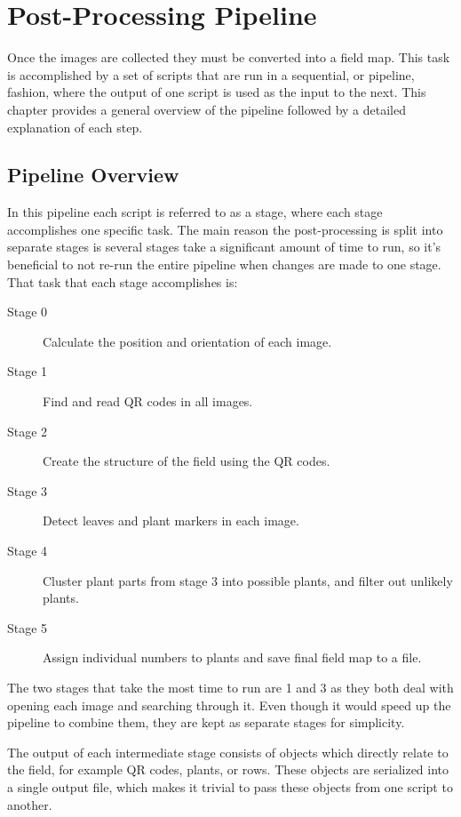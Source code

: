 
\cleardoublepage

\chapter{Post-Processing Pipeline}
\label{chapter:pipeline}

Once the images are collected they must be converted into a field map. This task is accomplished by a set of scripts that are run in a sequential, or pipeline, fashion, where the output of one script is used as the input to the next.  This chapter provides a general overview of the pipeline followed by a detailed explanation of each step.

\section{Pipeline Overview}
\label{processing-overview}

In this pipeline each script is referred to as a stage, where each stage accomplishes one specific task.  The main reason the post-processing is split into separate stages is several stages take a significant amount of time to run, so it's beneficial to not re-run the entire pipeline when changes are made to one stage.  That task that each stage accomplishes is:

\begin{description}
\item[Stage 0] Calculate the position and orientation of each image.
\item[Stage 1] Find and read QR codes in all images.
\item[Stage 2] Create the structure of the field using the QR codes.
\item[Stage 3] Detect leaves and plant markers in each image.
\item[Stage 4] Cluster plant parts from stage 3 into possible plants, and filter out unlikely plants.
\item[Stage 5] Assign individual numbers to plants and save final field map to a file. 
\end{description}

The two stages that take the most time to run are 1 and 3 as they both deal with opening each image and searching through it.  Even though it would speed up the pipeline to combine them, they are kept as separate stages for simplicity.
 
The output of each intermediate stage consists of objects which directly relate to the field, for example QR codes, plants, or rows.  These objects are serialized into a single output file, which makes it trivial to pass these objects from one script to another. 

